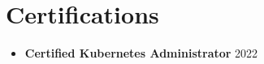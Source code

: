 \documentclass[a4paper]{mctemplate} %
\begin{document}
\begin{main}
\begin{itemize}
    \vspace{.3cm}
\end{itemize}

\section{Certifications}


\begin{itemize}
    \item \textbf{Certified Kubernetes Administrator}
    \newline
    {2022}

    \vspace{.3cm}
\end{itemize}

\end{main}
\end{document}
